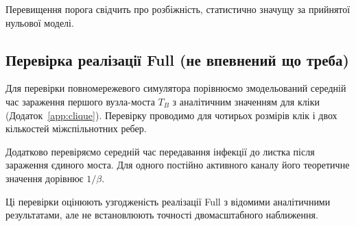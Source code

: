 Перевищення порога свідчить про розбіжність,
статистично значущу за прийнятої нульової
моделі. 






\subsection{Перевірка реалізації Full (не впевнений що треба)}

Для перевірки повномережевого симулятора
порівнюємо змодельований середній час
зараження першого вузла-моста $T_B$
з аналітичним значенням для кліки
(Додаток~\ref*{app:clique}).
Перевірку проводимо для чотирьох
розмірів клік і двох кількостей
міжспільнотних ребер.

Додатково перевіряємо середній час
передавання інфекції до листка
після зараження єдиного моста.
Для одного постійно активного каналу
його теоретичне значення дорівнює $1/\beta$.

Ці перевірки оцінюють узгодженість
реалізації Full з відомими аналітичними
результатами, але не встановлюють
точності двомасштабного наближення.









